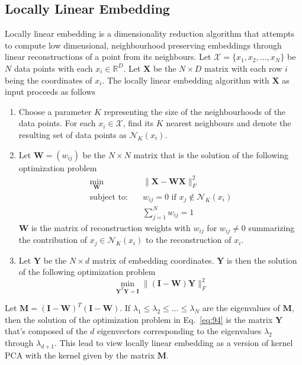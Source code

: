 \subsection{Locally Linear Embedding}
\label{sec:locally-line-embedd}
Locally linear embedding \citep{roweis00:_nonlin} is a dimensionality
reduction algorithm that attempts to compute low dimensional,
neighbourhood preserving embeddings through linear reconstructions of a
point from its neighbours. Let $\mathcal{X} = \{x_1,x_2, \dots, x_N\}$
be $N$ data points with each $x_i \in \mathbb{R}^{D}$. Let
$\mathbf{X}$ be the $N \times D$ matrix with each row $i$ being the
coordinates of $x_i$. The locally linear embedding algorithm with
$\mathbf{X}$ as input proceeds as follows
\begin{enumerate}
\item Choose a parameter $K$ representing the size of the
  neighbourhoods of the data points. For each $x_i \in \mathcal{X}$,
  find its $K$ nearest neighbours and denote the resulting set of data
  points as $\mathcal{N}_K(x_i)$.
\item Let $\mathbf{W} = (w_{ij})$ be the $N \times N$ matrix that is the solution
  of the following optimization problem
  \begin{align*}
    \min_{\mathbf{W}} & \quad \| \mathbf{X} - \mathbf{W}\mathbf{X} \|_F^{2} \\
    \text{subject to:} & \quad w_{ij} = 0 \,\, \text{if $x_j \not \in
      \mathcal{N}_K(x_i)$} \\
    & \quad \sum_{j=1}^{N}{w_{ij}} = 1
  \end{align*}
  $\mathbf{W}$ is the matrix of reconstruction weights with $w_{ij}$
  for $w_{ij} \not = 0$ summarizing the contribution of $x_j \in
  \mathcal{N}_K(x_i)$ to the reconstruction of $x_i$.
\item Let $\mathbf{Y}$ be the $N \times d$ matrix of embedding
  coordinates. $\mathbf{Y}$ is then the solution of the following
  optimization problem
  \begin{equation}
    \label{eq:94}
    \min_{\mathbf{Y}^{T}\mathbf{Y} =
      \mathbf{I}}\|(\mathbf{I} - \mathbf{W})\mathbf{Y}\|_{F}^{2}
  \end{equation}
\end{enumerate}
Let $\mathbf{M} = (\mathbf{I} - \mathbf{W})^{T}(\mathbf{I} -
\mathbf{W})$. If $\lambda_1 \leq \lambda_2 \leq \dots \leq \lambda_N$
are the eigenvalues of $\mathbf{M}$, then the solution of the
optimization problem in Eq.~\eqref{eq:94} is the matrix $\mathbf{Y}$
that's composed of the $d$ eigenvectors corresponding to the
eigenvalues $\lambda_2$ through $\lambda_{d+1}$. This lead
\citet{ham04} to view locally linear embedding as a version of kernel
PCA \citep{scholkopf97:_lectur_notes_comput_scien} with the kernel
given by the matrix $\mathbf{M}$.
%
%
